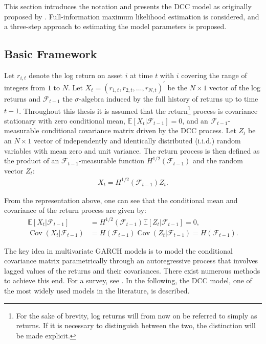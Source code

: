 This section introduces the notation and presents the DCC model as originally proposed by \textcite{ENGLE2002}. Full-information maximum likelihood estimation is considered, and a three-step approach to estimating the model parameters is proposed.

\subsection{Basic Framework}
Let $r_{i,t}$ denote the log return on asset $i$ at time $t$ with $i$ covering the range of integers from $1$ to $N$. Let $X_t = (r_{1,t}, r_{2,t}, \dots, r_{N,t})^\prime$ be the $N \times 1$ vector of the log returns and $\mathcal{F}_{t-1}$ the $\sigma$-algebra induced by the full history of returns up to time $t-1$. Throughout this thesis it is assumed that the return\footnote{For the sake of brevity, log returns will from now on be referred to simply as returns. If it is necessary to distinguish between the two, the distinction will be made explicit.} process is covariance stationary with zero conditional mean, $\mathbb{E}[X_t | \mathcal{F}_{t-1}] = 0$, and an $\mathcal{F}_{t-1}$-measurable conditional covariance matrix driven by the DCC process. Let $Z_t$ be an $N \times 1$ vector of independently and identically distributed (i.i.d.) random variables with mean zero and unit variance. The return process is then defined as the product of an $\mathcal{F}_{t-1}$-measurable function $H^{1/2}(\mathcal{F}_{t-1})$ and the random vector $Z_t$:
\begin{align}
	X_t = H^{1/2}(\mathcal{F}_{t-1})Z_t.
\end{align}

From the representation above, one can see that the conditional mean and covariance of the return process are given by:
\begin{align}
	\mathbb{E}[X_t|\mathcal{F}_{t-1}] &= H^{1/2}(\mathcal{F}_{t-1})\mathbb{E}[Z_t | \mathcal{F}_{t-1}] = 0, \\
	\operatorname{Cov}(X_t|\mathcal{F}_{t-1}) &= H(\mathcal{F}_{t-1}) \operatorname{Cov}(Z_t|\mathcal{F}_{t-1}) = H(\mathcal{F}_{t-1}).
\end{align}

The key idea in multivariate GARCH models is to model the conditional covariance matrix parametrically through an autoregressive process that involves lagged values of the returns and their covariances. There exist numerous methods to achieve this end. For a survey, see \textcite{BAUWENS}. In the following, the DCC model, one of the most widely used models in the literature, is described.

